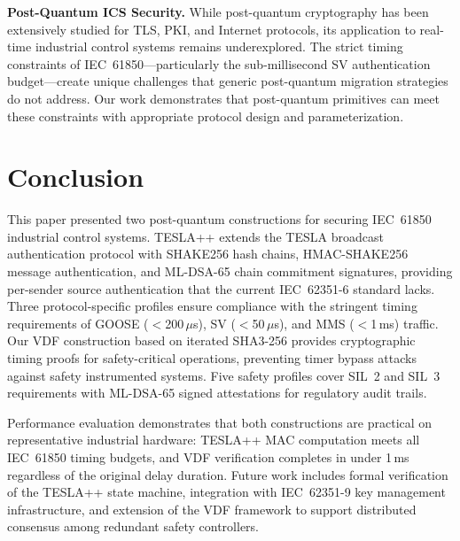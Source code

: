 \documentclass[conference,10pt]{IEEEtran}
\newcommand{\GOOSE}{\textsf{GOOSE}}
\newcommand{\SV}{\textsf{SV}}
\newcommand{\MMS}{\textsf{MMS}}
\begin{document}
\textbf{Post-Quantum ICS Security.} While post-quantum cryptography has been extensively studied for TLS, PKI, and Internet protocols, its application to real-time industrial control systems remains underexplored. The strict timing constraints of IEC~61850---particularly the sub-millisecond \SV{} authentication budget---create unique challenges that generic post-quantum migration strategies do not address. Our work demonstrates that post-quantum primitives can meet these constraints with appropriate protocol design and parameterization.

\section{Conclusion}
\label{sec:conclusion}

This paper presented two post-quantum constructions for securing IEC~61850 industrial control systems. TESLA++ extends the TESLA broadcast authentication protocol with SHAKE256 hash chains, HMAC-SHAKE256 message authentication, and ML-DSA-65 chain commitment signatures, providing per-sender source authentication that the current IEC~62351-6 standard lacks. Three protocol-specific profiles ensure compliance with the stringent timing requirements of \GOOSE{} ($<$200\,$\mu$s), \SV{} ($<$50\,$\mu$s), and \MMS{} ($<$1\,ms) traffic. Our VDF construction based on iterated SHA3-256 provides cryptographic timing proofs for safety-critical operations, preventing timer bypass attacks against safety instrumented systems. Five safety profiles cover SIL~2 and SIL~3 requirements with ML-DSA-65 signed attestations for regulatory audit trails.

Performance evaluation demonstrates that both constructions are practical on representative industrial hardware: TESLA++ MAC computation meets all IEC~61850 timing budgets, and VDF verification completes in under 1\,ms regardless of the original delay duration. Future work includes formal verification of the TESLA++ state machine, integration with IEC~62351-9 key management infrastructure, and extension of the VDF framework to support distributed consensus among redundant safety controllers.

\balance


\end{document}
